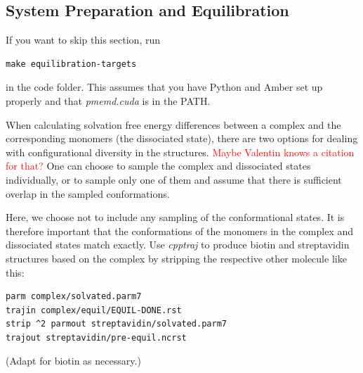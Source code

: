 \documentclass[9pt,tutorial]{livecoms}
\newcommand{\software}{\emph}
\newcommand{\todo}{\textcolor{red}}
\begin{document}
\subsection{System Preparation and Equilibration}
If you want to skip this section, run 
\begin{lstlisting}
make equilibration-targets
\end{lstlisting}
in the code folder. This assumes that you have Python and Amber set up properly and that \software{pmemd.cuda} is in the PATH.

When calculating solvation free energy differences between a complex and the corresponding monomers (the dissociated state), there are two options for dealing with configurational diversity in the structures.
\todo{Maybe Valentin knows a citation for that?}
One can choose to sample the complex and dissociated states individually, or to sample only one of them and assume that there is sufficient overlap in the sampled conformations.

Here, we choose not to include any sampling of the conformational states. 
It is therefore important that the conformations of the monomers in the complex and dissociated states match exactly. 
Use \software{cpptraj} to produce biotin and streptavidin structures based on the complex by stripping the respective other molecule like this:
\begin{lstlisting}
parm complex/solvated.parm7
trajin complex/equil/EQUIL-DONE.rst
strip ^2 parmout streptavidin/solvated.parm7
trajout streptavidin/pre-equil.ncrst
\end{lstlisting}
(Adapt for biotin as necessary.)

\end{document}
